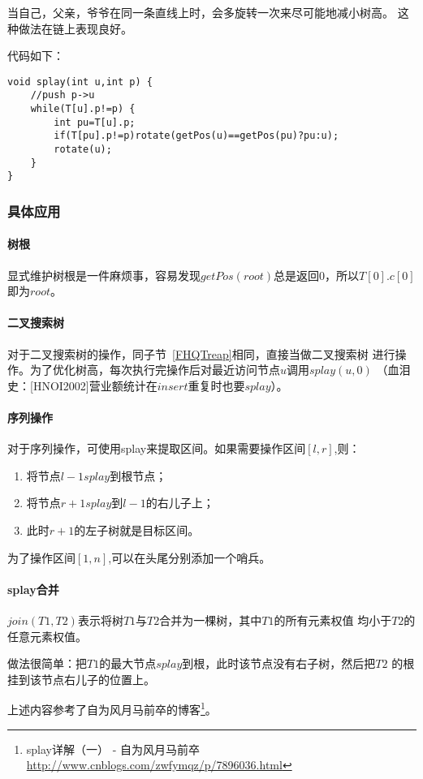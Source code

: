 当自己，父亲，爷爷在同一条直线上时，会多旋转一次来尽可能地减小树高。
这种做法在链上表现良好。

代码如下：

\begin{lstlisting}[title=splay]
void splay(int u,int p) {
    //push p->u
    while(T[u].p!=p) {
        int pu=T[u].p;
        if(T[pu].p!=p)rotate(getPos(u)==getPos(pu)?pu:u);
        rotate(u);
    }
}
\end{lstlisting}

\subsubsection{具体应用}

\paragraph{树根}

显式维护树根是一件麻烦事，容易发现$getPos(root)$总是返回0，所以$T[0].c[0]$
即为$root$。

\paragraph{二叉搜索树}

对于二叉搜索树的操作，同子节~\ref{FHQTreap}相同，直接当做二叉搜索树
进行操作。为了优化树高，每次执行完操作后对最近访问节点$u$调用$splay(u,0)$
（血泪史：[HNOI2002]营业额统计在$insert$重复时也要$splay$）。

\paragraph{序列操作}

对于序列操作，可使用splay来提取区间。如果需要操作区间$[l,r]$,则：

\begin{enumerate}
	\item 将节点$l-1 splay$到根节点；
	\item 将节点$r+1 splay$到$l-1$的右儿子上；
	\item 此时$r+1$的左子树就是目标区间。
\end{enumerate}

为了操作区间$[1,n]$,可以在头尾分别添加一个哨兵。

\paragraph{splay合并}

$join(T1,T2)$表示将树$T1$与$T2$合并为一棵树，其中$T1$的所有元素权值
均小于$T2$的任意元素权值。

做法很简单：把$T1$的最大节点$splay$到根，此时该节点没有右子树，然后把$T2$
的根挂到该节点右儿子的位置上。

上述内容参考了自为风月马前卒的博客\footnote{splay详解（一） - 自为风月马前卒
	\url{http://www.cnblogs.com/zwfymqz/p/7896036.html}}。
